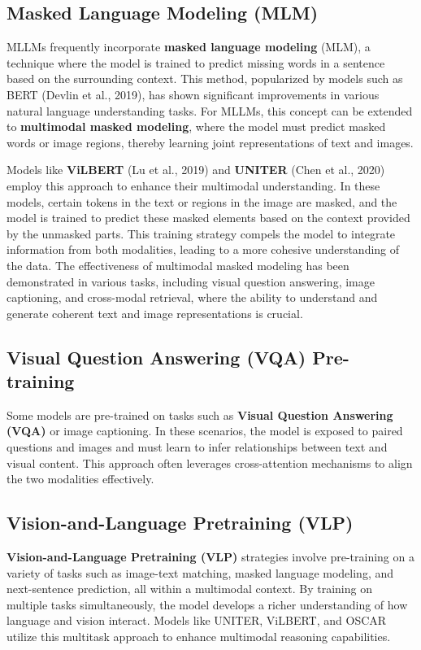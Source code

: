 \subsection{Masked Language Modeling (MLM)}

MLLMs frequently incorporate \textbf{masked language modeling} (MLM), a technique where the model is trained to predict missing words in a sentence based on the surrounding context. This method, popularized by models such as BERT (Devlin et al., 2019), has shown significant improvements in various natural language understanding tasks. For MLLMs, this concept can be extended to \textbf{multimodal masked modeling}, where the model must predict masked words or image regions, thereby learning joint representations of text and images.

Models like \textbf{ViLBERT} (Lu et al., 2019) and \textbf{UNITER} (Chen et al., 2020) employ this approach to enhance their multimodal understanding. In these models, certain tokens in the text or regions in the image are masked, and the model is trained to predict these masked elements based on the context provided by the unmasked parts. This training strategy compels the model to integrate information from both modalities, leading to a more cohesive understanding of the data. The effectiveness of multimodal masked modeling has been demonstrated in various tasks, including visual question answering, image captioning, and cross-modal retrieval, where the ability to understand and generate coherent text and image representations is crucial.

\subsection{Visual Question Answering (VQA) Pre-training}

Some models are pre-trained on tasks such as \textbf{Visual Question Answering (VQA)} or image captioning. In these scenarios, the model is exposed to paired questions and images and must learn to infer relationships between text and visual content. This approach often leverages cross-attention mechanisms to align the two modalities effectively.

\subsection{Vision-and-Language Pretraining (VLP)}

\textbf{Vision-and-Language Pretraining (VLP)} strategies involve pre-training on a variety of tasks such as image-text matching, masked language modeling, and next-sentence prediction, all within a multimodal context. By training on multiple tasks simultaneously, the model develops a richer understanding of how language and vision interact. Models like UNITER, ViLBERT, and OSCAR utilize this multitask approach to enhance multimodal reasoning capabilities.

